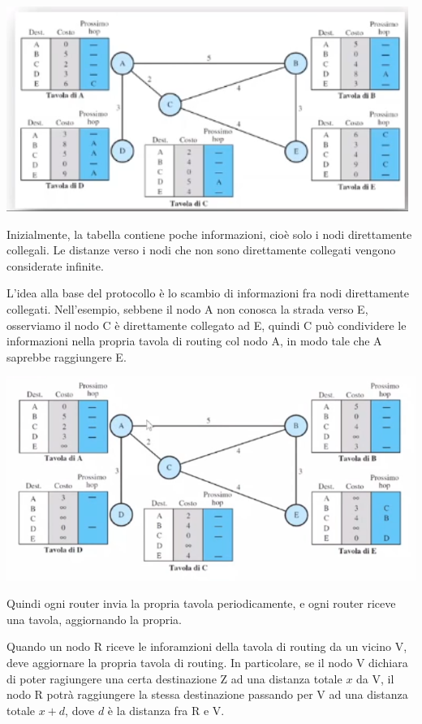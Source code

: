         \begin{center}
            \includegraphics[scale=0.5]{images/Vector.png}
        \end{center}
        
        Inizialmente, la tabella contiene poche informazioni, cioè solo i nodi direttamente collegali. Le distanze verso i nodi che non sono direttamente collegati vengono considerate infinite.
        
        L'idea alla base del protocollo è lo scambio di informazioni fra nodi direttamente collegati. Nell'esempio, sebbene il nodo A non conosca la strada verso E, osserviamo il nodo C è direttamente collegato ad E, quindi C può condividere le informazioni nella propria tavola di routing col nodo A, in modo tale che A saprebbe raggiungere E.
        
        \begin{center}
            \includegraphics[scale=0.5]{images/Vector2.png}
        \end{center}
        
        Quindi ogni router invia la propria tavola periodicamente, e ogni router riceve una tavola, aggiornando la propria.
        
        Quando un nodo R riceve le inforamzioni della tavola di routing da un vicino V, deve aggiornare la propria tavola di routing. In particolare, se il nodo V dichiara di poter ragiungere una certa destinazione Z ad una distanza totale $x$ da V, il nodo R potrà raggiungere la stessa destinazione passando per V ad una distanza totale $x+d$, dove $d$ è la distanza fra R e V.
        

